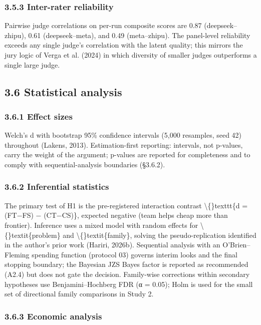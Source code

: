 \documentclass[11pt,a4paper]{article}
\begin{document}
\subsubsection{3.5.3 Inter-rater reliability}

Pairwise judge correlations on per-run composite scores are 0.87
(deepseek–zhipu), 0.61 (deepseek–meta), and 0.49 (meta–zhipu). The
panel-level reliability exceeds any single judge's correlation with
the latent quality; this mirrors the jury logic of Verga et al.
(2024) in which diversity of smaller judges outperforms a single
large judge.

\subsection{3.6 Statistical analysis}

\subsubsection{3.6.1 Effect sizes}

Welch's d with bootstrap 95\% confidence intervals (5,000 resamples,
seed 42) throughout (Lakens, 2013). Estimation-first reporting:
intervals, not p-values, carry the weight of the argument; p-values
are reported for completeness and to comply with sequential-analysis
boundaries (§3.6.2).

\subsubsection{3.6.2 Inferential statistics}

The primary test of H1 is the pre-registered interaction contrast
\textbackslash\{\}texttt\{d = (FT−FS) − (CT−CS)\}, expected negative (team helps cheap more than
frontier). Inference uses a mixed model with random effects for
\textbackslash\{\}textit\{problem\} and \textbackslash\{\}textit\{family\}, solving the pseudo-replication identified in
the author's prior work (Hariri, 2026b). Sequential analysis with an
O'Brien–Fleming spending function (protocol 03) governs interim looks
and the final stopping boundary; the Bayesian JZS Bayes factor is
reported as recommended (A2.4) but does not gate the decision.
Family-wise corrections within secondary hypotheses use
Benjamini–Hochberg FDR (α = 0.05); Holm is used for the small set of
directional family comparisons in Study 2.

\subsubsection{3.6.3 Economic analysis}
\end{document}

